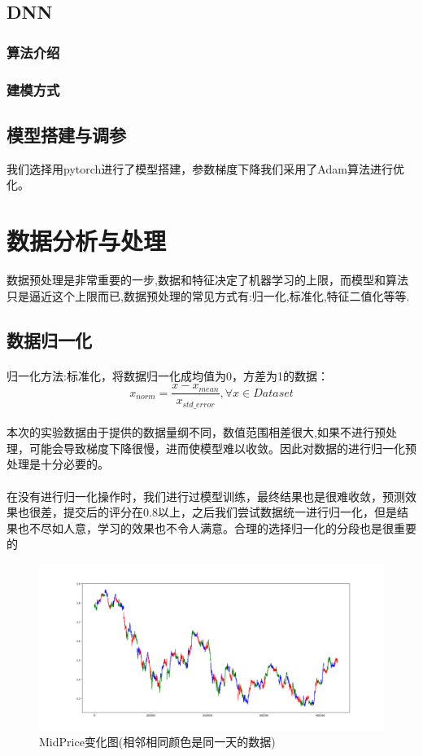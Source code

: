 \documentclass[UTF8]{ctexart}
\begin{document}
\subsection{DNN}
\subsubsection{算法介绍}
\subsubsection{建模方式}
\subsection{模型搭建与调参}
我们选择用pytorch进行了模型搭建，参数梯度下降我们采用了Adam算法进行优化。
\section{数据分析与处理}
数据预处理是非常重要的一步,数据和特征决定了机器学习的上限，而模型和算法只是逼近这个上限而已,数据预处理的常见方式有:归一化,标准化,特征二值化等等.
\subsection{数据归一化}
\paragraph{}归一化方法:标准化，将数据归一化成均值为0，方差为1的数据：
$$x_{norm} = \frac{x - x_{mean}}{x_{std\_error}},\forall x \in Dataset $$

\paragraph{}本次的实验数据由于提供的数据量纲不同，数值范围相差很大,如果不进行预处理，可能会导致梯度下降很慢，进而使模型难以收敛。因此对数据的进行归一化预处理是十分必要的。
\paragraph{}在没有进行归一化操作时，我们进行过模型训练，最终结果也是很难收敛，预测效果也很差，提交后的评分在0.8以上，之后我们尝试数据统一进行归一化，但是结果也不尽如人意，学习的效果也不令人满意。合理的选择归一化的分段也是很重要的
\begin{figure}[!htbp]
    \centering
    \includegraphics[scale = 0.3]{p8.png}
    \caption{MidPrice变化图(相邻相同颜色是同一天的数据)}
\end{figure}
\end{document}
